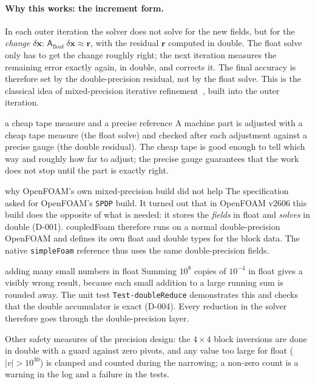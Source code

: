 \documentclass[11pt,a4paper]{article}
\newcommand{\vect}[1]{\mathbf{#1}}
\newcommand{\code}[1]{\texttt{#1}}
\begin{document}
\paragraph{Why this works: the increment form.} In each outer iteration the
solver does not solve for the new fields, but for the \emph{change}
$\delta\vect x$: $\mathsf A_{\text{float}}\,\delta\vect x\approx\vect r$, with
the residual $\vect r$ computed in double. The float solve only has to get
the change roughly right; the next iteration measures the remaining error
exactly again, in double, and corrects it. The final accuracy is therefore
set by the double-precision residual, not by the float solve. This is the
classical idea of mixed-precision iterative
refinement~\cite{Baboulin2009,Carson2018}, built into the outer iteration.

\begin{intuition}{a cheap tape measure and a precise reference}
  A machine part is adjusted with a cheap tape measure (the float solve)
  and checked after each adjustment against a precise gauge (the double
  residual). The cheap tape is good enough to tell which way and roughly how
  far to adjust; the precise gauge guarantees that the work does not stop
  until the part is exactly right.
\end{intuition}

\begin{pitfall}{why OpenFOAM's own mixed-precision build did not help}
  The specification asked for OpenFOAM's \code{SPDP} build. It turned out
  that in OpenFOAM v2606 this build does the opposite of what is needed:
  it stores the \emph{fields} in float and \emph{solves} in double (D-001).
  coupledFoam therefore runs on a normal double-precision OpenFOAM and
  defines its own float and double types for the block data. The native
  \code{simpleFoam} reference thus uses the same double-precision fields.
\end{pitfall}

\begin{pitfall}{adding many small numbers in float}
  Summing $10^8$ copies of $10^{-4}$ in float gives a visibly wrong result,
  because each small addition to a large running sum is rounded away. The
  unit test \code{Test-doubleReduce} demonstrates this and checks that the
  double accumulator is exact (D-004). Every reduction in the solver
  therefore goes through the double-precision layer.
\end{pitfall}

Other safety measures of the precision design: the $4\times4$ block
inversions are done in double with a guard against zero pivots, and any
value too large for float ($|v|>10^{30}$) is clamped and counted during the
narrowing; a non-zero count is a warning in the log and a failure in the
tests.
\end{document}
